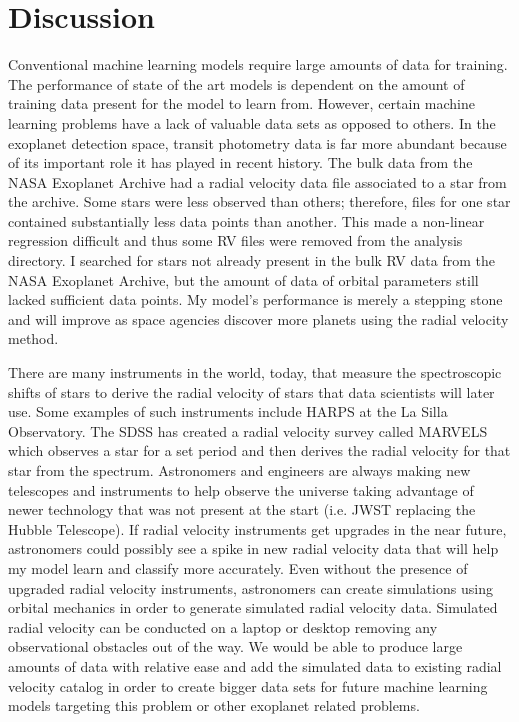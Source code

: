 \documentclass[12pt]{article}
\begin{document}
\section{Discussion}
\label{sec:discussion}
Conventional machine learning models require large amounts of data for training. The performance of state of the art models is dependent on the amount of training data present for the model to learn from. However, certain machine learning problems have a lack of valuable data sets as opposed to others. In the exoplanet detection space, transit photometry data is far more abundant because of its important role it has played in recent history. The bulk data from the NASA Exoplanet Archive had a radial velocity data file associated to a star from the archive. Some stars were less observed than others; therefore, files for one star contained substantially less data points than another. This made a non-linear regression difficult and thus some RV files were removed from the analysis directory. I searched for stars not already present in the bulk RV data from the NASA Exoplanet Archive, but the amount of data of orbital parameters still lacked sufficient data points. My model's performance is merely a stepping stone and will improve as space agencies discover more planets using the radial velocity method.
\par
There are many instruments in the world, today, that measure the spectroscopic shifts of stars to derive the radial velocity of stars that data scientists will later use. Some examples of such instruments include HARPS at the La Silla Observatory. The SDSS has created a radial velocity survey called MARVELS which observes a star for a set period and then derives the radial velocity for that star from the spectrum. Astronomers and engineers are always making new telescopes and instruments to help observe the universe taking advantage of newer technology that was not present at the start (i.e. JWST replacing the Hubble Telescope). If radial velocity instruments get upgrades in the near future, astronomers could possibly see a spike in new radial velocity data that will help my model learn and classify more accurately. Even without the presence of upgraded radial velocity instruments, astronomers can create simulations using orbital mechanics in order to generate simulated radial velocity data. Simulated radial velocity can be conducted on a laptop or desktop removing any observational obstacles out of the way. We would be able to produce large amounts of data with relative ease and add the simulated data to existing radial velocity catalog in order to create bigger data sets for future machine learning models targeting this problem or other exoplanet related problems. 
\end{document}
